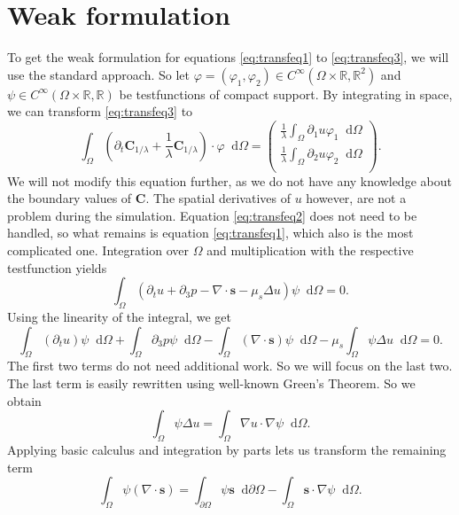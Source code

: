 \documentclass[12pt,a4paper,twoside, open=right]{scrreprt}
\theoremstyle{definition}
\theoremstyle{plain}
\newcommand{\rr}{\mathbb{R}}
\newcommand{\bfs}{\bm{s}}
\newcommand{\bfC}{\bm{C}}
\newcommand{\D}{\mathop{}\!\mathrm{d}}
\begin{document}
\section{Weak formulation}
To get the weak formulation for equations \eqref{eq:transfeq1} to \eqref{eq:transfeq3}, we will use the standard approach. So let $\varphi = (\varphi_1,\varphi_2)\in C^\infty(\Omega\times\rr,\rr^2)$ and $\psi\in C^\infty(\Omega\times\rr,\rr)$ be testfunctions of compact support. By integrating in space, we can transform \eqref{eq:transfeq3} to 
\begin{equation}
    \int_\Omega(\partial_t\bfC_{1/\lambda}+\frac{1}{\lambda}\bfC_{1/\lambda})\cdot\varphi\D\Omega = 
    \begin{pmatrix}
    \frac{1}{\lambda}\int_\Omega\partial_1 u\varphi_1\D\Omega\\\frac{1}{\lambda}\int_\Omega\partial_2 u\varphi_2\D\Omega\\
    \end{pmatrix}.
\end{equation}
We will not modify this equation further, as we do not have any knowledge about the boundary values of $\bfC$. The spatial derivatives of $u$ however, are not a problem during the simulation. Equation \eqref{eq:transfeq2} does not need to be handled, so what remains is equation \eqref{eq:transfeq1}, which also is the most complicated one. Integration over $\Omega$ and multiplication with the respective testfunction yields
\begin{equation}
    \int_\Omega(\partial_t u + \partial_3 p -\nabla\cdot \bfs -\mu_s\Delta u)\psi\D\Omega = 0.
\end{equation}
Using the linearity of the integral, we get
\begin{equation}
    \int_\Omega(\partial_t u)\psi\D\Omega +\int_\Omega\partial_3 p\psi\D\Omega -\int_\Omega(\nabla\cdot \bfs)\psi\D\Omega -\mu_s\int_\Omega\psi\Delta u\D\Omega=0.
\end{equation}
The first two terms do not need additional work. So we will focus on the last two. The last term is easily rewritten using well-known Green's Theorem. So we obtain
\begin{equation}
    \int_\Omega \psi\Delta u = \int_\Omega\nabla u\cdot \nabla\psi\D\Omega.
\end{equation}
Applying basic calculus and integration by parts lets us transform the remaining term
\begin{equation}
    \int_\Omega \psi(\nabla\cdot\bfs) =\int_{\partial\Omega}\psi\bfs\D\partial\Omega -\int_\Omega\bfs\cdot\nabla\psi\D\Omega.
\end{equation}
\end{document}
